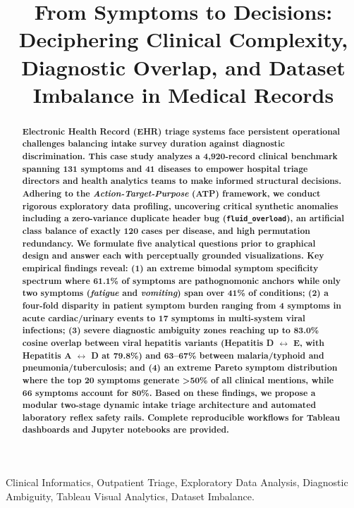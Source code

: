 \documentclass[conference]{IEEEtran}
\title{From Symptoms to Decisions: Deciphering Clinical Complexity, Diagnostic Overlap, and Dataset Imbalance in Medical Records}
\author{
    \IEEEauthorblockN{Athirasree A S}
    \IEEEauthorblockA{
        \vspace{0.1cm}
        Dept. of Computer Science and Engineering\\
        Amrita School of Computing, Bengaluru\\
        Amrita Vishwa Vidyapeetham, India\\
        Email: bl.sc.u4cse24205@bl.students.amrita.edu
    }
}
\begin{document}
\maketitle

\begin{abstract}
\bfseries
Electronic Health Record (EHR) triage systems face persistent operational challenges balancing intake survey duration against diagnostic discrimination. This case study analyzes a 4,920-record clinical benchmark spanning 131 symptoms and 41 diseases to empower hospital triage directors and health analytics teams to make informed structural decisions. Adhering to the \textit{Action-Target-Purpose} (ATP) framework, we conduct rigorous exploratory data profiling, uncovering critical synthetic anomalies including a zero-variance duplicate header bug (\texttt{fluid\_overload}), an artificial class balance of exactly 120 cases per disease, and high permutation redundancy. We formulate five analytical questions prior to graphical design and answer each with perceptually grounded visualizations. Key empirical findings reveal: (1) an extreme bimodal symptom specificity spectrum where 61.1\% of symptoms are pathognomonic anchors while only two symptoms (\textit{fatigue} and \textit{vomiting}) span over 41\% of conditions; (2) a four-fold disparity in patient symptom burden ranging from 4 symptoms in acute cardiac/urinary events to 17 symptoms in multi-system viral infections; (3) severe diagnostic ambiguity zones reaching up to 83.0\% cosine overlap between viral hepatitis variants (Hepatitis D $\leftrightarrow$ E, with Hepatitis A $\leftrightarrow$ D at 79.8\%) and 63--67\% between malaria/typhoid and pneumonia/tuberculosis; and (4) an extreme Pareto symptom distribution where the top 20 symptoms generate >50\% of all clinical mentions, while 66 symptoms account for 80\%. Based on these findings, we propose a modular two-stage dynamic intake triage architecture and automated laboratory reflex safety rails. Complete reproducible workflows for Tableau dashboards and Jupyter notebooks are provided.
\end{abstract}

\begin{IEEEkeywords}
Clinical Informatics, Outpatient Triage, Exploratory Data Analysis, Diagnostic Ambiguity, Tableau Visual Analytics, Dataset Imbalance.
\end{IEEEkeywords}
\end{document}
